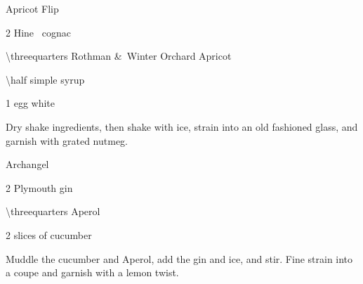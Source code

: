 \begin{PDTCocktail}{Apricot Flip}
	\begin{Ingredients}
	\item \SI{2}{\oz} Hine \vsop\ cognac
	\item \SI{\threequarters}{\oz} Rothman \&\ Winter Orchard Apricot
	\item \SI{\half}{\oz} simple syrup
	\item 1 egg white
	\end{Ingredients}
	
	\begin{Instructions}
	Dry shake ingredients, then shake with ice, strain into an old fashioned glass, and garnish with grated nutmeg.
	\end{Instructions}
\end{PDTCocktail}

\begin{PDTCocktail}{Archangel}
	\begin{Ingredients}
	\item \SI{2}{\oz} Plymouth gin
	\item \SI{\threequarters}{\oz} Aperol
	\item 2 slices of cucumber
	\end{Ingredients}
	
	\begin{Instructions}
	Muddle the cucumber and Aperol, add the gin and ice, and stir.  Fine strain into a coupe and garnish with a lemon twist.
	\end{Instructions}
\end{PDTCocktail}